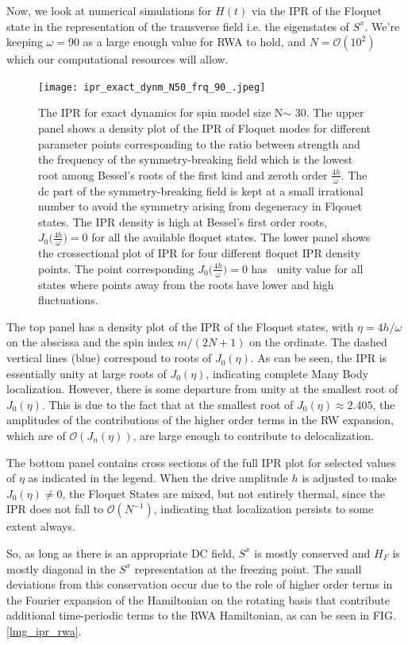 \documentclass[%
 reprint,
superscriptaddress,
 amsmath,amssymb,
 aps,
prb,
]{revtex4-2}
\begin{document}
Now, we look at numerical simulations for $H(t)$ via the IPR of the Floquet state in the representation of the transverse field i.e. the eigenstates of $S^x$. We're keeping $\omega = 90$ as a large enough value for RWA to hold, and $N=\mathcal{O}(10^2)$ which our computational resources will allow. 

\begin{figure}[ht!]
	\centering
	\texttt{[image: ipr\_exact\_dynm\_N50\_frq\_90\_.jpeg]}
	\caption{The IPR for exact dynamics for spin model size N$\sim$ 30. The upper panel shows a density plot of the IPR of Floquet modes for different parameter points corresponding to the ratio between strength and the frequency of the symmetry-breaking field which is the lowest root among Bessel's roots of the first kind and zeroth order $\frac{4h}{\omega}$. The dc part of the symmetry-breaking field is kept at a small irrational number to avoid the symmetry arising from degeneracy in Flqouet states. The IPR density is high at Bessel's first order roots, $J_0\Big(\frac{4h}{\omega}\Big)=0$ for all the available floquet states. The lower panel shows the crossectional plot of IPR for four different floquet IPR density points. The point corresponding $J_0\Big(\frac{4h}{\omega}\Big)=0$ has ~unity value for all states where points away from the roots have lower and high fluctuations.}
	\label{lmg_ipr_exact}
\end{figure}
The top panel has a density plot of the IPR of the Floquet states, with $\eta=4h/\omega$ on the abscissa and the spin index $m/(2N+1)$ on the ordinate. The dashed vertical lines (blue) correspond to roots of $J_0(\eta)$. As can be seen, the IPR is essentially unity at large roots of $J_0(\eta)$, indicating complete Many Body localization. However, there is some departure from unity at the smallest root of $J_0(\eta)$. This is due to the fact that at the smallest root of $J_0(\eta)\approx 2.405$, the amplitudes of the contributions of the higher order terms in the RW expansion, which are of $\mathcal{O}(J_n(\eta))$, are large enough to contribute to delocalization.

The bottom panel contains cross sections of the full IPR plot for selected values of $\eta$ as indicated in the legend. When the drive amplitude $h$ is adjusted to make $J_0(\eta)\neq 0$, the Floquet States are mixed, but not entirely thermal, since the IPR does not fall to $\mathcal{O}(N^{-1})$, indicating that localization persists to some extent always.

So, as long as there is an appropriate DC field, $S^x$ is mostly conserved and $H_F$ is mostly diagonal in the $S^x$ representation at the freezing point. The small deviations from this conservation occur due to the role of higher order terms in the Fourier expansion of the Hamiltonian on the rotating basis that contribute additional time-periodic terms to the RWA Hamiltonian, as can be seen in FIG.\ref{lmg_ipr_rwa}.
\end{document}
